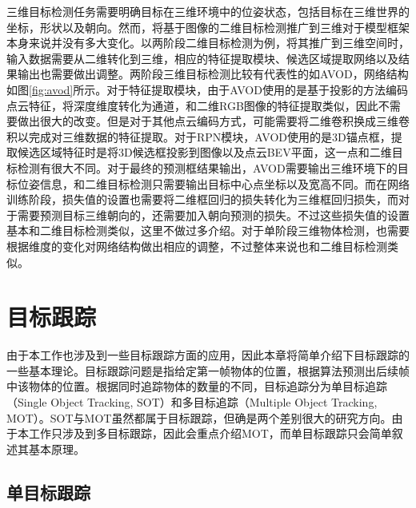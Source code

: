 三维目标检测任务需要明确目标在三维环境中的位姿状态，包括目标在三维世界的坐标，形状以及朝向。然而，将基于图像的二维目标检测推广到三维对于模型框架本身来说并没有多大变化。以两阶段二维目标检测为例，将其推广到三维空间时，输入数据需要从二维转化到三维，相应的特征提取模块、候选区域提取网络以及结果输出也需要做出调整。两阶段三维目标检测比较有代表性的如AVOD\cite{ku2018joint}，网络结构如图\ref{fig:avod}所示。对于特征提取模块，由于AVOD使用的是基于投影的方法编码点云特征，将深度维度转化为通道，和二维RGB图像的特征提取类似，因此不需要做出很大的改变。但是对于其他点云编码方式，可能需要将二维卷积换成三维卷积以完成对三维数据的特征提取。对于RPN模块，AVOD使用的是3D锚点框，提取候选区域特征时是将3D候选框投影到图像以及点云BEV平面，这一点和二维目标检测有很大不同。对于最终的预测框结果输出，AVOD需要输出三维环境下的目标位姿信息，和二维目标检测只需要输出目标中心点坐标以及宽高不同。而在网络训练阶段，损失值的设置也需要将二维框回归的损失转化为三维框回归损失，而对于需要预测目标三维朝向的，还需要加入朝向预测的损失。不过这些损失值的设置基本和二维目标检测类似，这里不做过多介绍。对于单阶段三维物体检测，也需要根据维度的变化对网络结构做出相应的调整，不过整体来说也和二维目标检测类似。



%
%

\section{目标跟踪}
\label{object_tracking}
由于本工作也涉及到一些目标跟踪方面的应用，因此本章将简单介绍下目标跟踪的一些基本理论。目标跟踪问题是指给定第一帧物体的位置，根据算法预测出后续帧中该物体的位置。根据同时追踪物体的数量的不同，目标追踪分为单目标追踪（Single Object Tracking, SOT）和多目标追踪（Multiple Object Tracking, MOT）。SOT与MOT虽然都属于目标跟踪，但确是两个差别很大的研究方向。由于本工作只涉及到多目标跟踪，因此会重点介绍MOT，而单目标跟踪只会简单叙述其基本原理。

\subsection{单目标跟踪}
\label{single_tracking}

